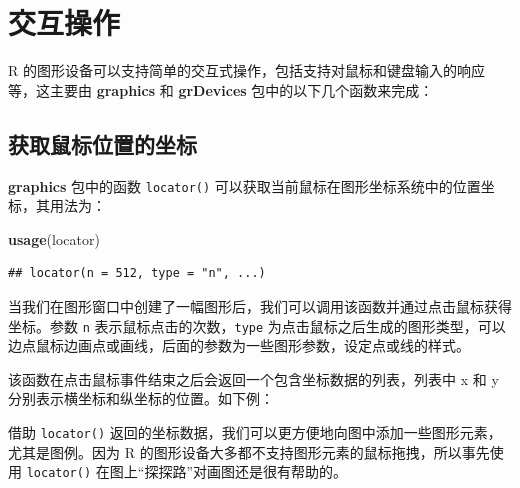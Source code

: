 \documentclass[
  b5paper,
  UTF8,twoside]{book}
\newenvironment{Shaded}{\begin{snugshade}}{\end{snugshade}}
\newcommand{\CommentTok}[1]{\textcolor[rgb]{0.56,0.35,0.01}{\textit{#1}}}
\newcommand{\DecValTok}[1]{\textcolor[rgb]{0.00,0.00,0.81}{#1}}
\newcommand{\FunctionTok}[1]{\textcolor[rgb]{0.13,0.29,0.53}{\textbf{#1}}}
\newcommand{\NormalTok}[1]{#1}
\begin{document}
\section{交互操作}\label{sec:interaction}

R 的图形设备可以支持简单的交互式操作，包括支持对鼠标和键盘输入的响应等，这主要由 \textbf{graphics} 和 \textbf{grDevices} 包中的以下几个函数来完成：

\subsection{获取鼠标位置的坐标}\label{ux83b7ux53d6ux9f20ux6807ux4f4dux7f6eux7684ux5750ux6807}

\textbf{graphics} 包中的函数 \texttt{locator()} 可以获取当前鼠标在图形坐标系统中的位置坐标，其用法为：

\begin{Shaded}
\begin{Highlighting}[]
\FunctionTok{usage}\NormalTok{(locator)}
\end{Highlighting}
\end{Shaded}

\begin{verbatim}
## locator(n = 512, type = "n", ...)
\end{verbatim}

当我们在图形窗口中创建了一幅图形后，我们可以调用该函数并通过点击鼠标获得坐标。参数 \texttt{n} 表示鼠标点击的次数，\texttt{type} 为点击鼠标之后生成的图形类型，可以边点鼠标边画点或画线，后面的参数为一些图形参数，设定点或线的样式。

该函数在点击鼠标事件结束之后会返回一个包含坐标数据的列表，列表中 x 和 y 分别表示横坐标和纵坐标的位置。如下例：

\begin{Shaded}
\end{Shaded}

借助 \texttt{locator()} 返回的坐标数据，我们可以更方便地向图中添加一些图形元素，尤其是图例。因为 R 的图形设备大多都不支持图形元素的鼠标拖拽，所以事先使用 \texttt{locator()} 在图上``探探路''对画图还是很有帮助的。
\end{document}
